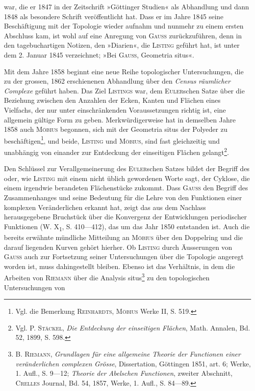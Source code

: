 war, die er 1847 in der Zeitschrift »Göttinger Studien« als Abhandlung und
dann 1848 als besondere Schrift veröffentlicht hat. Dass er im Jahre 1845
seine Beschäftigung mit der Topologie wieder aufnahm und nunmehr zu einem
ersten Abschluss kam, ist wohl auf eine Anregung von \textsc{Gauss} zurückzuführen,
denn in den tagebuchartigen Notizen, den »Diarien«, die \textsc{Listing} geführt hat,
ist unter dem 2. Januar 1845 verzeichnet; »Bei \textsc{Gauss}, Geometria situs«.
\par
Mit dem Jahre 1858 beginnt eine neue Reihe topologischer Untersuchungen,
die zu der grossen, 1862 erschienenen Abhandlung über den \textit{Census räumlicher
Complexe} geführt haben. Das Ziel \textsc{Listings} war, dem \textsc{Euler}schen Satze über
die Beziehung zwischen den Anzahlen der Ecken, Kanten und Flächen eines
Vielfachs, der nur unter einschränkenden Voraussetzungen richtig ist, eine
allgemein gültige Form zu geben. Merkwürdigerweise hat in demselben
\clearpage{}\setcounter{footnote}{0}
\noindent Jahre 1858 auch \textsc{Möbius} begonnen, sich mit der Geometria situs der Polyeder
zu beschäftigen\footnote{Vgl. die Bemerkung \textsc{Reinhardts}, \textsc{Möbius} Werke II, S. 519.}, und beide, \textsc{Listing} und \textsc{Möbius}, sind fast gleichzeitig und
unabhängig von einander zur Entdeckung der einseitigen Flächen gelangt\footnote{Vgl. P. \textsc{Stäckel}, \textit{Die Entdeckung der einseitigen Flächen}, Math. Annalen, Bd. 52, 1899, S. 598.}.
\par
Den Schlüssel zur Verallgemeinerung des \textsc{Euler}schen Satzes bildet der
Begriff des  oder, wie \textsc{Listing} mit einem nicht üblich gewordenen
Worte sagt, der Cyklose, die einem irgendwie berandeten Flächenstücke
zukommt. Dass \textsc{Gauss} den Begriff des Zusammenhanges und seine
Bedeutung für die Lehre von den Funktionen einer komplexen Veränderlichen
erkannt hat, zeigt das aus dem Nachlass herausgegebene Bruchstück über die
Konvergenz der Entwicklungen periodischer Funktionen (W. X\textsubscript{1}, S. 410—412),
das um das Jahr 1850 entstanden ist. Auch die bereits erwähnte mündliche
Mitteilung an \textsc{Möbius} über den Doppelring und die darauf liegenden Kurven
gehört hierher. Ob \textsc{Listing} durch Äusserungen von \textsc{Gauss} auch zur Fortsetzung
seiner Untersuchungen über die Topologie angeregt worden ist, muss
dahingestellt bleiben. Ebenso ist das Verhältnis, in dem die Arbeiten von
\textsc{Riemann} über die Analysis situs\footnote{B. \textsc{Riemann}, \textit{Grundlagen für eine allgemeine Theorie der Functionen einer veränderlichen complexen Grösse}, Dissertation, Göttingen 1851, art. 6; Werke, 1. Aufl., S. 9—12; \textit{Theorie der Abelschen Functionen}, zweiter Abschnitt, \textsc{Crelles} Journal, Bd. 54, 1857, Werke, 1. Aufl., S. 84—89.} zu den topologischen Untersuchungen von
